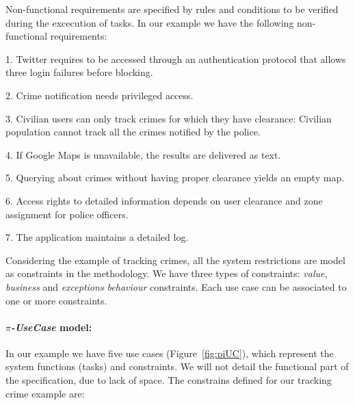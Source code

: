 Non-functional requirements are specified by rules and conditions to be verified during the excecution of tasks.
In our example we have the following non-functional requirements:
\begin{trivlist}
\item[1.] Twitter requires to be accessed through an authentication protocol that allows three login failures before blocking. 
\item[2.] Crime notification needs privileged access.
\item[3.] Civilian users can only track crimes for which they have clearance: Civilian population cannot track all the crimes notified by the police. 
\item[4.] If \textsf{Google Maps} is unavailable, the results are delivered as text. 
\item[5.] Querying about crimes without having proper clearance yields an empty map.
\item[6.] Access rights to detailed information depends on user clearance and zone assignment for police officers. 
\item[7.] The application maintains a detailed log. 
\end{trivlist}

Considering the example of tracking crimes, all the system restrictions are
model as constraints in the methodology. We have three types of constraints:
\textit{value}, \textit{business} and \textit{exceptions behaviour} constraints.
Each use case can be associated to one or more constraints.

\paragraph*{\textit{$\pi$-UseCase} model:} 
In our example we have five use cases (Figure~\ref{fig:piUC}), which represent the
system functions (tasks) and constraints. 
We will not detail the functional part of the specification, due to lack of space.
The constrains defined for our tracking crime example are: 

